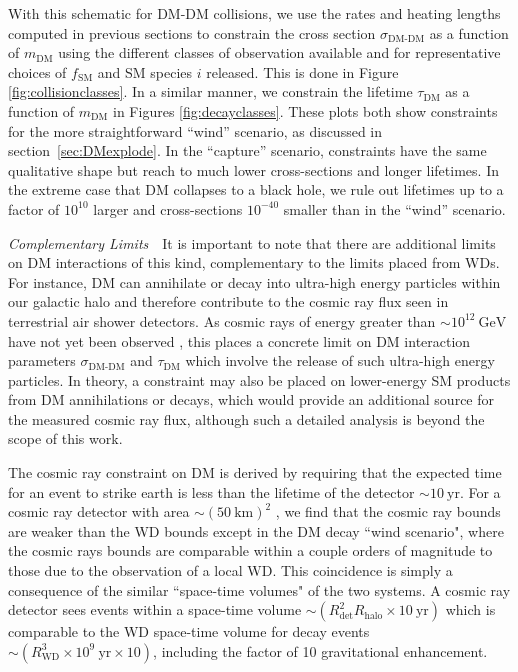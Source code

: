 \documentclass[twocolumn, preprintnumbers,amsmath,amssymb,prd, superscriptaddress]{revtex4}
\newcommand{\GeV}{\text{GeV}}
\begin{document}
With this schematic for DM-DM collisions, we use the rates and heating lengths computed in previous sections to constrain the cross section $\sigma_\text{DM-DM}$ as a function of $m_\text{DM}$ using the different classes of observation available and for representative choices of $f_\text{SM}$ and SM species $i$ released.
This is done in Figure \ref{fig:collisionclasses}.
In a similar manner, we constrain the lifetime $\tau_\text{DM}$ as a function of $m_\text{DM}$ in Figures \ref{fig:decayclasses}.
These plots both show constraints for the more straightforward ``wind'' scenario, as discussed in section~\ref{sec:DMexplode}.
In the ``capture'' scenario, constraints have the same qualitative shape but reach to much lower cross-sections and longer lifetimes.
In the extreme case that DM collapses to a black hole, we rule out lifetimes up to a factor of $10^{10}$ larger and cross-sections $10^{-40}$ smaller than in the ``wind'' scenario.

\emph{Complementary Limits}~~It is important to note that there are additional limits on DM interactions of this kind, complementary to the limits placed from WDs.
For instance, DM can annihilate or decay into ultra-high energy particles within our galactic halo and therefore contribute to the cosmic ray flux seen in terrestrial air shower detectors.
As cosmic rays of energy greater than $\sim 10^{12} ~\GeV$ have not yet been observed \cite{ThePierreAuger:2015rha, AbuZayyad:2012ru}, this places a concrete limit on DM interaction parameters $\sigma_\text{DM-DM}$ and $\tau_\text{DM}$ which involve the release of such ultra-high energy particles.
In theory, a constraint may also be placed on lower-energy SM products from DM annihilations or decays, which would provide an additional source for the measured cosmic ray flux, although such a detailed analysis is beyond the scope of this work.

The cosmic ray constraint on DM is derived by requiring that the expected time for an event to strike earth is less than the lifetime of the detector $\sim 10 ~\text{yr}$.
For a cosmic ray detector with area $ \sim (50~\text{km})^2$ \cite{ThePierreAuger:2015rha}, we find that the cosmic ray bounds are weaker than the WD bounds except in the DM decay ``wind scenario", where the cosmic rays bounds are comparable within a couple orders of magnitude to those due to the observation of a local WD.
This coincidence is simply a consequence of the similar ``space-time volumes" of the two systems.
A cosmic ray detector sees events within a space-time volume $\sim (R_\text{det}^2 R_\text{halo} \times 10 ~\text{yr})$ which is comparable to the WD space-time volume for decay events $\sim (R_\text{WD}^3 \times 10^9 ~\text{yr}\times 10)$, including the factor of 10 gravitational enhancement.
\end{document}
